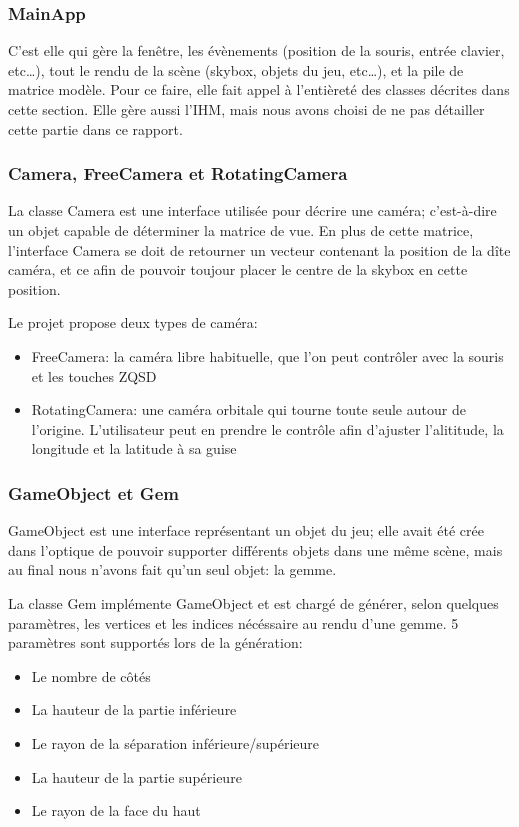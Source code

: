 \documentclass[a4paper,12pt]{article}
\begin{document}
\subsubsection{MainApp}
C'est elle qui gère la fenêtre, les évènements (position de la souris, entrée clavier, etc\ldots), tout le
rendu de la scène (skybox, objets du jeu, etc\ldots), et la pile de matrice modèle.
Pour ce faire, elle fait appel à l'entièreté des classes décrites dans cette section. Elle gère aussi l'IHM,
mais nous avons choisi de ne pas détailler cette partie dans ce rapport.

\subsubsection{Camera, FreeCamera et RotatingCamera}
La classe Camera est une interface utilisée pour décrire une caméra; c'est-à-dire un objet capable de déterminer
la matrice de vue. En plus de cette matrice, l'interface Camera se doit de retourner un vecteur contenant la
position de la dîte caméra, et ce afin de pouvoir toujour placer le centre de la skybox en cette position.

Le projet propose deux types de caméra:
\begin{itemize}
    \item FreeCamera: la caméra libre habituelle, que l'on peut contrôler avec la souris et les touches ZQSD
    \item RotatingCamera: une caméra orbitale qui tourne toute seule autour de l'origine. L'utilisateur peut en prendre le contrôle afin d'ajuster l'alititude, la longitude et la latitude à sa guise
\end{itemize}

\subsubsection{GameObject et Gem}
GameObject est une interface représentant un objet du jeu; elle avait été crée dans l'optique de pouvoir supporter
différents objets dans une même scène, mais au final nous n'avons fait qu'un seul objet: la gemme.

La classe Gem implémente GameObject et est chargé de générer, selon quelques paramètres, les vertices et les indices
nécéssaire au rendu d'une gemme. 5 paramètres sont supportés lors de la génération:
\begin{itemize}
    \item Le nombre de côtés
    \item La hauteur de la partie inférieure
    \item Le rayon de la séparation inférieure/supérieure
    \item La hauteur de la partie supérieure
    \item Le rayon de la face du haut
\end{itemize}
\end{document}
